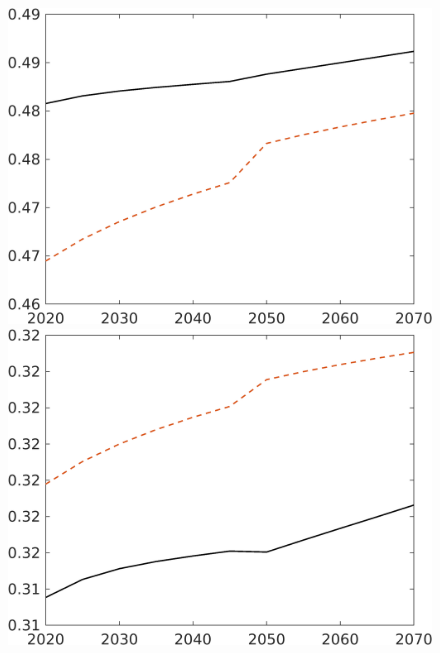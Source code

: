 \begin{figure}[h!!]
\begin{minipage}[]{0.32\textwidth}
		\includegraphics[width=1\textwidth]{../../codding_model/own_basedOnFried/optimalPol_190722_tidiedUp/figures/all_10Aout22/hh_CompEffOPT_T_NoTaus_regime3_opteff_spillover0_noskill0_sep1_xgrowth0_countec0_etaa0.79_lgd0_lff0.png}
	\end{minipage}
	\begin{minipage}[]{0.32\textwidth}
		\includegraphics[width=1\textwidth]{../../codding_model/own_basedOnFried/optimalPol_190722_tidiedUp/figures/all_10Aout22/hl_CompEffOPT_T_NoTaus_regime3_opteff_spillover0_noskill0_sep1_xgrowth0_countec0_etaa0.79_lgd0_lff0.png}
	\end{minipage}
	

\end{figure}
